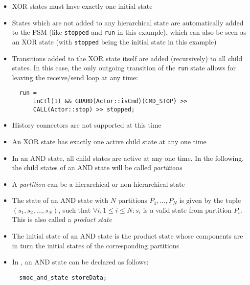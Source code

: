 \begin{frame}[fragile=singleslide]
\begin{itemize}
\item XOR states must have exactly one initial state
\item States which are not added to any hierarchical state are automatically added to the FSM (like \texttt{stopped} and \texttt{run} in this example), which can also be seen as an XOR state (with \texttt{stopped} being the initial state in this example)
\item Transitions added to the XOR state itself are added (recursively) to all child states. In this case, the only outgoing transition of the \texttt{run} state allows for leaving the receive/send loop at any time: 
\begin{lstlisting}
  run =
      inCtl(1) && GUARD(Actor::isCmd)(CMD_STOP) >>
      CALL(Actor::stop) >> stopped;
\end{lstlisting}
\item History connectors are not supported at this time
\end{itemize}
\end{frame}

\begin{frame}[fragile=singleslide]
\begin{itemize}
\item An XOR state has exactly one active child state at any one time
\item In an AND state, all child states are active at any one time. In the following, the child states of an AND state will be called \emph{partitions}
\item A \emph{partition} can be a hierarchical or non-hierarchical state
\item The state of an AND state with $N$ partitions $P_1,\ldots,P_N$ is given by the tuple $(s_1,s_2,\ldots,s_N)$, such that $\forall i, 1 \leq i \leq N: s_i $ is a valid state from partition $P_i$. This is also called a \emph{product state}
\item The initial state of an AND state is the product state whose components are in turn the initial states of the corresponding partitions
\item In \SysteMoC, an AND state can be declared as follows: 
\begin{lstlisting}
  smoc_and_state storeData;
\end{lstlisting}
\end{itemize}
\end{frame}

